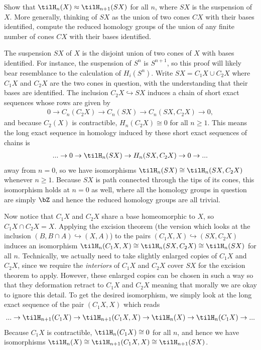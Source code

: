 \begin{homework}[e]
   Show that $\tilH_n(X) \approx \tilH_{n+1}(SX)$ for all $n$, where $SX$ is the suspension of $X$. More generally, thinking of $SX$ as the union of two cones $CX$ with their bases identified, compute the reduced homology groups of the union of any finite number of cones $CX$ with their bases identified.
  \begin{prf}
    The suspension $SX$ of $X$ is the disjoint union of two cones of $X$ with bases identified. For instance, the suspension of $S^n$ is $S^{n+1}$, so this proof will likely bear resemblance to the calculation of $H_i(S^n)$. Write $SX = C_1X\cup C_2X$ where $C_1X$ and $C_2X$ are the two cones in question, with the understanding that their bases are identified. The inclusion $C_2X \hookrightarrow SX$ induces a chain of short exact sequences whose rows are given by
    \begin{align*}
      0 \to C_n(C_2X) \to C_n(SX) \to C_n(SX,C_2X) \to 0,
    \end{align*}
    and because $C_2(X)$ is contractible, $H_n(C_2X) \cong 0$ for all $n \geq 1$. This means the long exact sequence in homology induced by these short exact sequences of chains is
    \begin{align*}
      ... \to 0 \to \tilH_n(SX) \to H_n(SX,C_2X) \to 0 \to ...
    \end{align*}
    away from $n = 0$, so we have isomorphisms $\tilH_n(SX) \cong \tilH_n(SX,C_2X)$ whenever $n \geq 1$. Because $SX$ is path connected through the tips of its cones, this isomorphism holds at $n = 0$ as well, where all the homology groups in question are simply $\bZ$ and hence the reduced homology groups are all trivial.

    Now notice that $C_1X$ and $C_2X$ share a base homeomorphic to $X$, so $C_1X\cap C_2X = X$. Applying the excision theorem (the version which looks at the inclusion $(B,B\cap A)\hookrightarrow (X,A)$) to the pairs $(C_1X,X) \hookrightarrow (SX,C_2X)$ induces an isomorphism $\tilH_n(C_1X,X) \cong \tilH_n(SX,C_2X) \cong \tilH_n(SX)$ for all $n$. Technically, we actually need to take slightly enlarged copies of $C_1X$ and $C_2X$, since we require the \emph{interiors} of $C_1X$ and $C_2X$ cover $SX$ for the excision theorem to apply. However, these enlarged copies can be chosen in such a way so that they deformation retract to $C_1X$ and $C_2X$ meaning that morally we are okay to ignore this detail. To get the desired isomorphism, we simply look at the long exact sequence of the pair $(C_1X,X)$ which reads
    \begin{align*}
      ... \to \tilH_{n+1}(C_1X) \to \tilH_{n+1}(C_1X,X) \to \tilH_n(X) \to \tilH_n(C_1X) \to ...
    \end{align*}
    Because $C_1X$ is contractible, $\tilH_n(C_1X) \cong 0$ for all $n$, and hence we have isomorphisms $\tilH_n(X) \cong \tilH_{n+1}(C_1X,X) \cong \tilH_{n+1}(SX)$.


\end{prf}
\end{homework}
